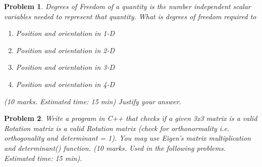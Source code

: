 \documentclass[twocolumn]{article}
\newtheorem{prob}{Problem}
\newif\ifsol
\begin{document}
\begin{prob}
  Degrees of Freedom of a quantity is the number independent scalar variables
  needed to represent that quantity. What is degrees of freedom required to 
  \begin{enumerate}
    \item Position and orientation in 1-D
    \item Position and orientation in 2-D
    \item Position and orientation in 3-D
    \item Position and orientation in 4-D
  \end{enumerate} (10 marks. Estimated time: 15 min)
  Justify your answer.
\end{prob}

\ifsol
\paragraph*{Solution}
\begin{enumerate}
  \item 1D: position requires 1-DoF,  orientation requires a binary flag.
  \item 2D: position requires 2-DoF, orientation requires a single angle: 1-DoF.
  \item 3D: position requires 3-DoF, orientation requires 3-DoF because there
    are three pairs of axis X-Y, Y-Z, Z-X.
  \item 4D: position requires 4-DoF, orientation requires 6-DoF because there
    are 6 pairs of axis: $^4C_2 = 6$.
\end{enumerate}
\fi

\begin{prob}
  Write a program in C++ that checks if a given
  3x3 matrix is a valid Rotation matrix is a valid Rotation matrix  (check for
  orthonormality i.e. orthogonality and determinant = 1). You may use Eigen's
  matrix multiplication and determinant() function. (10 marks. Used in the
  following problems. Estimated time: 15 min). 
\end{prob}

\ifsol
\paragraph*{Solution}
Please look at the function \verb|is_valid_rot| in file \verb|hw1.cpp|.
\fi
\end{document}
